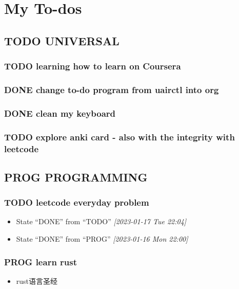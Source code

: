 \documentclass[11pt]{article}
\author{MeowKing}
\date{\today}
\title{}
\begin{document}
\tableofcontents


\section{My To-dos}
\label{sec:orgfe5b416}
\subsection{{\bfseries\sffamily TODO} UNIVERSAL}
\label{sec:org5642942}
\subsubsection{{\bfseries\sffamily TODO} learning how to learn on Coursera}
\label{sec:org1fb237d}
\subsubsection{{\bfseries\sffamily DONE} change to-do program from uairctl into org}
\label{sec:org4807cb3}
\subsubsection{{\bfseries\sffamily DONE} clean my keyboard}
\label{sec:orgb53006b}
\subsubsection{{\bfseries\sffamily TODO} explore anki card - also with the integrity with leetcode}
\label{sec:orgce152e7}


\subsection{{\bfseries\sffamily PROG} PROGRAMMING}
\label{sec:org2423897}
\subsubsection{{\bfseries\sffamily TODO} leetcode everyday problem}
\label{sec:orge7eb5a1}
\begin{itemize}
\item State ``DONE''       from ``TODO''       \textit{[2023-01-17 Tue 22:04]}
\item State ``DONE''       from ``PROG''       \textit{[2023-01-16 Mon 22:00]}
\end{itemize}
\subsubsection{{\bfseries\sffamily PROG} learn rust}
\label{sec:org0229ae4}
\begin{itemize}
\item rust语言圣经
\end{itemize}
\end{document}
